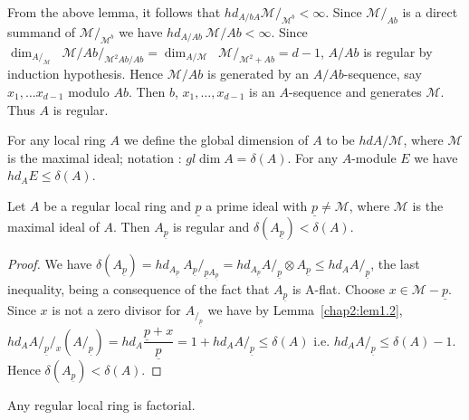 From the above lemma, it follows that $hd_{A/bA}
\mathscr{M}/_{\mathscr{M}^b}< \infty$. Since $\mathscr{M}/_{Ab}$
is a direct summand of $\mathscr{M}/_{\mathscr{M}^b}$ we have $hd
_{A/{Ab}} ~ \mathscr{M}/{Ab} < \infty$. Since
$\dim_{A/_{\mathscr{M}}} \;\; \mathscr{M}/Ab \big/_{\mathscr{M}^2
  Ab / Ab} =  \dim_{A /\mathscr{M}}  \;\; \mathscr{M} /_{\mathscr{M}^2
  + Ab} = d-1$, $A/Ab$ is regular by induction hypothesis. Hence
$\mathscr{M}/Ab$ is generated by an $A/{Ab}$-sequence, say
$x_1, \ldots x_{d-1}$ modulo $Ab$. Then $b$, $x_1 , \ldots , x_{d-1}$ is
an $A$-sequence and generates $\mathscr{M}$. Thus $A$ is regular. 
    
For any local ring $A$ we define the global dimension of $A$ to be $hd
A/\mathscr{M}$, where $\mathscr{M}$ is the maximal ideal;
notation : $g l \dim A = \delta (A)$. For any $A$-module $E$ we have
$hd_A E \le \delta (A)$. 

\begin{coro*} %
Let $A$ be a regular local ring and $\underline{p}$ a prime ideal with
$\underline{p} \neq \mathscr{M}$, where $\mathscr{M}$ is the maximal
ideal of $A$. Then $A_{\underline{p}}$ is regular and $\delta
(A_{\underline{p}}) < \delta (A)$. 
\end{coro*}
    
\begin{proof}
We have $\delta (A_{\underline{p}}) = hd_{A_{\underline{p}}} ~
A_{\underline{p}}/_{\underline{p}A_{\underline{p}}} =
hd_{A_{\underline{p}}} A/_{\underline{p}} \otimes A_{\underline{p}}
\le hd_A A/_{\underline{p}}$, the last inequality, being a consequence
of the fact that $A_{\underline{p}}$ is A-flat. Choose\pageoriginale
$x \in \mathscr{M} - \underline{p}$. Since $x$ is not a zero divisor
for $A_{/_{\underline{p}}}$ we have by Lemma~\ref{chap2:lem1.2}, $hd_A 
A/_{\underline{p}}/_{x}(A/_{\underline{p}}) = hd_A
\dfrac{\underline{p} + x}{\underline{p}}=1 + hd_A A/_{\underline{p}}
\le \delta (A)$ i.e. $hd_A A/_{\underline{p}} \le \delta (A) -
1$. Hence $\delta (A_{\underline{p}}) < \delta (A)$. 
\end{proof}  

      
\setcounter{theorem}{5}
\begin{theorem}%
Any regular local ring is factorial.
\end{theorem}   
     
